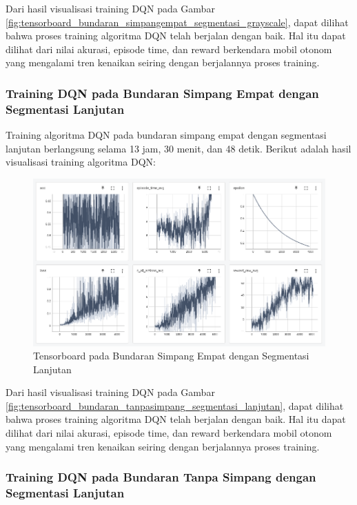 \documentclass[conference]{IEEEtran}
\begin{document}
	Dari hasil visualisasi training DQN pada Gambar \ref{fig:tensorboard_bundaran_simpangempat_segmentasi_grayscale}, dapat dilihat bahwa proses training algoritma DQN telah berjalan dengan baik. Hal itu dapat dilihat dari nilai akurasi, episode time, dan reward berkendara mobil otonom yang mengalami tren kenaikan seiring dengan berjalannya proses training.
	
	\subsubsection{Training DQN pada Bundaran Simpang Empat dengan Segmentasi Lanjutan}
	\label{sec:training_dqn_bundaran_simpangempat_segmentasi_hitam_putih}
	
	Training algoritma DQN pada bundaran simpang empat dengan segmentasi lanjutan berlangsung selama 13 jam, 30 menit, dan 48 detik. Berikut adalah hasil visualisasi training algoritma DQN:
	
	\begin{figure}[H] 
		\centering
		\includegraphics[width=1\linewidth]{images/tensorboard_bunderan_segmented}
		\caption{Tensorboard pada Bundaran Simpang Empat dengan Segmentasi Lanjutan}
		\label{fig:tensorboard_bundaran_simpangempat_segmentasi_lanjutan}
	\end{figure}
	
	Dari hasil visualisasi training DQN pada Gambar \ref{fig:tensorboard_bundaran_tanpasimpang_segmentasi_lanjutan}, dapat dilihat bahwa proses training algoritma DQN telah berjalan dengan baik. Hal itu dapat dilihat dari nilai akurasi, episode time, dan reward berkendara mobil otonom yang mengalami tren kenaikan seiring dengan berjalannya proses training.
	
	
	\subsubsection{Training DQN pada Bundaran Tanpa Simpang dengan Segmentasi Lanjutan}
	\label{sec:training_dqn_bundaran_nosimpang_segmentasi_hitam_putih}
	
\end{document}
